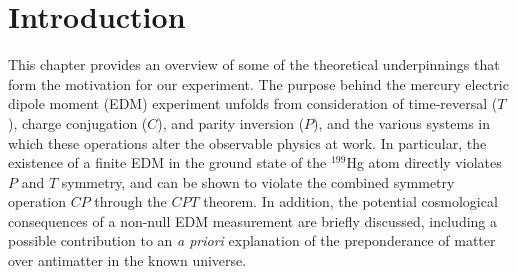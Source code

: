 \documentclass [10pt, twoside] {uwthesis}[2012/04/02]
\begin{document}
\chapter{Introduction}     
This chapter provides an overview of some of the theoretical underpinnings that form the motivation for our experiment. The purpose behind the mercury electric dipole moment (EDM) experiment unfolds from consideration of time-reversal ($T$), charge conjugation ($C$), and parity inversion ($P$), and the various systems in which these operations alter the observable physics at work. In particular, the existence of a finite EDM in the ground state of the $^{199}$Hg atom directly violates $P$ and $T$ symmetry, and can be shown to violate the combined symmetry operation $CP$ through the $CPT$ theorem. In addition, the potential cosmological consequences of a non-null EDM measurement are briefly discussed, including a possible contribution to an \textit{a priori} explanation of the preponderance of matter over antimatter in the known universe.
\end{document}
